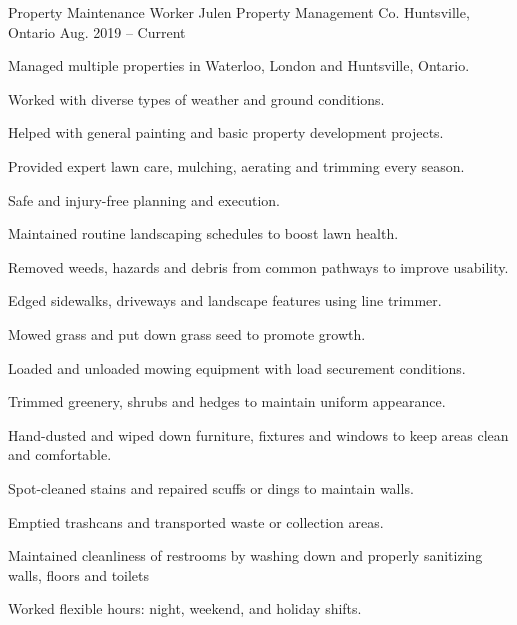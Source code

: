 

\begin{cventries}

  \cventry
    {Property Maintenance Worker} %
    {Julen Property Management Co.} %
    {Huntsville, Ontario} %
    {Aug. 2019 -- Current} %
    {
      \begin{cvitems} %
        \item {Managed multiple properties in Waterloo, London and Huntsville, Ontario.}
        \item {Worked with diverse types of weather and ground conditions.}
        \item {Helped with general painting and basic property development projects.}
        \item {Provided expert lawn care, mulching, aerating and trimming every season.}
        \item {Safe and injury-free planning and execution.}
        \item {Maintained routine landscaping schedules to boost lawn health.}
        \item {Removed weeds, hazards and debris from common pathways to improve usability.}
        \item{Edged sidewalks, driveways and landscape features using line trimmer.}
        \item{Mowed grass and put down grass seed to promote growth.}
        \item{Loaded and unloaded mowing equipment with load securement conditions.}
        \item{Trimmed greenery, shrubs and hedges to maintain uniform appearance.}
        \item{Hand-dusted and wiped down furniture, fixtures and windows to keep areas clean and comfortable.}
        \item{Spot-cleaned stains and repaired scuffs or dings to maintain walls.}
        \item{Emptied trashcans and transported waste or collection areas.}
        \item {Maintained cleanliness of restrooms by washing down and properly sanitizing walls, floors and toilets}
        \item{Worked flexible hours: night, weekend, and holiday shifts.}
      \end{cvitems}
    }


\end{cventries}
